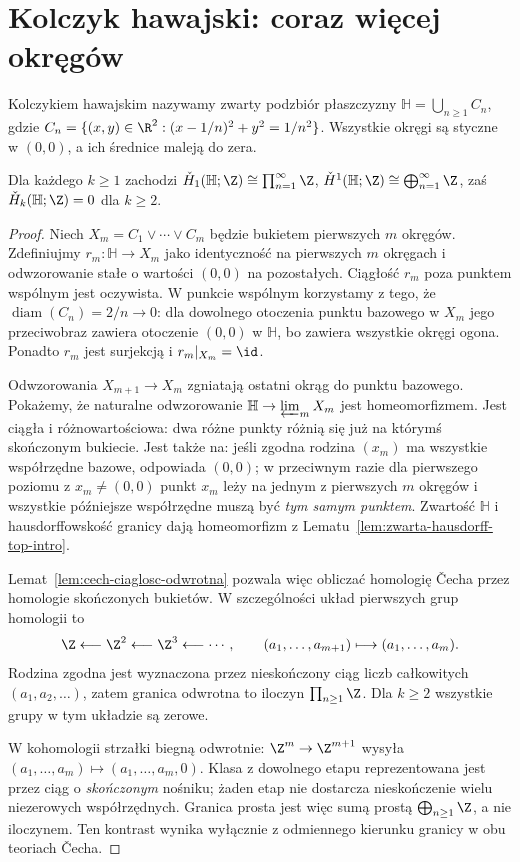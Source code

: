 \section{Kolczyk hawajski: coraz więcej okręgów}
\begin{definicja}
Kolczykiem hawajskim nazywamy zwarty podzbiór płaszczyzny
$\mathbb H=\bigcup_{n\ge1}C_n$, gdzie
$C_n=\{(x,y)\in\R^2:(x-1/n)^2+y^2=1/n^2\}$.
Wszystkie okręgi są styczne w $(0,0)$, a ich średnice
maleją do zera.
\end{definicja}

\begin{stwierdzenie}
Dla każdego $k\ge1$ zachodzi
$\check H_1(\mathbb H;\Z)\cong\prod_{n=1}^{\infty}\Z$,
$\check H^{1}(\mathbb H;\Z)\cong
\bigoplus_{n=1}^{\infty}\Z$,
zaś $\check H_k(\mathbb H;\Z)=0$ dla $k\ge2$.
\end{stwierdzenie}
\begin{proof}
Niech $X_m=C_1\vee\cdots\vee C_m$ będzie bukietem
pierwszych $m$ okręgów. Zdefiniujmy
$r_m:\mathbb H\to X_m$ jako identyczność na
pierwszych $m$ okręgach i odwzorowanie stałe
o wartości $(0,0)$ na pozostałych.
Ciągłość $r_m$ poza punktem wspólnym jest oczywista.
W punkcie wspólnym korzystamy z tego, że
$\operatorname{diam}(C_n)=2/n\to0$:
dla dowolnego otoczenia punktu bazowego w $X_m$
jego przeciwobraz zawiera otoczenie $(0,0)$
w $\mathbb H$, bo zawiera wszystkie okręgi ogona.
Ponadto $r_m$ jest surjekcją i
$r_m|_{X_m}=\id$.

Odwzorowania $X_{m+1}\to X_m$ zgniatają
ostatni okrąg do punktu bazowego.
Pokażemy, że naturalne odwzorowanie
$\mathbb H\to\varprojlim_m X_m$ jest
homeomorfizmem. Jest ciągła i różnowartościowa:
dwa różne punkty różnią się już na którymś
skończonym bukiecie. Jest także na:
jeśli zgodna rodzina $(x_m)$ ma wszystkie
współrzędne bazowe, odpowiada $(0,0)$;
w przeciwnym razie dla pierwszego poziomu
z $x_m\ne(0,0)$ punkt $x_m$ leży na jednym
z pierwszych $m$ okręgów i wszystkie późniejsze
współrzędne muszą być \emph{tym samym punktem}.
Zwartość $\mathbb H$ i hausdorffowskość granicy
dają homeomorfizm z
Lematu~\ref{lem:zwarta-hausdorff-top-intro}.

Lemat~\ref{lem:cech-ciaglosc-odwrotna}
pozwala więc obliczać homologię \v{C}echa przez
homologie skończonych bukietów. W szczególności układ
pierwszych grup homologii to
\[
\Z\longleftarrow\Z^2\longleftarrow\Z^3\longleftarrow\cdots,
\qquad (a_1,\ldots,a_{m+1})\longmapsto(a_1,\ldots,a_m).
\]
Rodzina zgodna jest wyznaczona przez nieskończony ciąg
liczb całkowitych $(a_1,a_2,\ldots)$, zatem granica odwrotna
to iloczyn $\prod_{n\ge1}\Z$. Dla $k\ge2$ wszystkie grupy
w tym układzie są zerowe.

W kohomologii strzałki biegną odwrotnie:
$\Z^m\to\Z^{m+1}$ wysyła
$(a_1,\ldots,a_m)\mapsto(a_1,\ldots,a_m,0)$.
Klasa z dowolnego etapu reprezentowana jest przez
ciąg o \emph{skończonym} nośniku; żaden etap
nie dostarcza nieskończenie wielu niezerowych
współrzędnych. Granica prosta jest więc sumą prostą
$\bigoplus_{n\ge1}\Z$, a nie iloczynem.
Ten kontrast wynika wyłącznie z odmiennego
kierunku granicy w obu teoriach \v{C}echa.
\end{proof}

